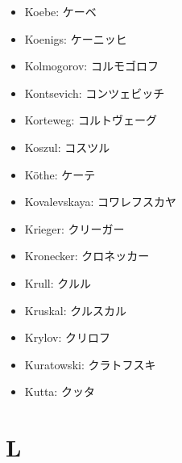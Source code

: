 \documentclass[openany, a4paper, oneside]{jsbook}
\begin{document}
\begin{itemize}
\begin{itemize}
\end{itemize}
\item Koebe: ケーベ
\item Koenigs: ケーニッヒ
\item Kolmogorov: コルモゴロフ
\item Kontsevich: コンツェビッチ
\item Korteweg: コルトヴェーグ
\item Koszul: コスツル
\item K\"othe: ケーテ
\item Kovalevskaya: コワレフスカヤ
\item Krieger: クリーガー
\item Kronecker: クロネッカー
\item Krull: クルル
\item Kruskal: クルスカル
\item Krylov: クリロフ
\item Kuratowski: クラトフスキ
\item Kutta: クッタ
\end{itemize}
\section{L}
\end{document}
